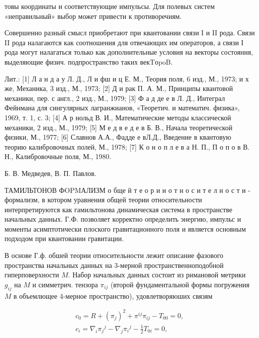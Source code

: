 \documentclass[10pt]{article}
\begin{document}
товы координаты и соответствующие импульсы. Для полевых систем «неправильный» выбор может привести к противоречиям.



Совершенно разный смысл приобретают при квантовании связи I и II рода. Связи II рода налагаются как соотношения для отвечающих им операторов, а связи І рода могут налагаться только как дополнительные условия на векторы состояния, выделяющие физич. подпространство таких векTоpoB.



Лит.: [1] Л а н д а у Л. Д., Л и фш и ц Е. М., Теория поля, 6 изд., М., 1973; и х же, Механика, 3 изд., М., 1973; [2] Д и рак П. А. М., Принципы квантовой механики, пер. с англ., 2 изд., М., 1979; [3] Ф а д де е в Л. Д., Интеграл Фейнмана для сингулярных лагранжианов, «Теоретич. и математич. физика», 1969, т. 1, с. 3; [4] А р нольд В. И., Математические методы классической механики, 2 изд., М., 1979; [5] М е д в е д е в Б. В., Начала теоретической физики, М., 1977; [6] Славнов А.А., Фадде е вЛ.Д., Введение в квантовую теорию калибровочных полей, М., 1978; [7] К о н о п л е в а Н. П., П о п о в В. Н., Калибровочные поля, М., 1980.



Б. В. Медведев, В. П. Павлов.



ТАМИЛЬТОНОВ ФOPMАЛИЗМ о бще й т е о р и и о т н о с и т е л н о с т и - формализм, в котором уравнения общей теории относительности интерпретируются как гамильтонова динамическая система в пространстве начальных данных. Г.Ф. позволяет корректно определить энергию, импульс и моменты асимптотически плоского гравитационного поля и является основным подходом при квантовании гравитации.



В основе Г.ф. обшей теории относительности лежит описание фазового пространства начальных данных на 3-мерной пространственноподобной гиперповерхности $M$. Набор начальных данных состоит из римановой метрики $g_{i j}$ на $M$ и симметрич. тензора $\pi_{i j}$ (второй фундаментальной формы погружения $M$ в объемлющее 4-мерное пространство), удовлетворяюших связям



\[

\begin{gathered}

c_{0}=R+\left(\pi_{j}\right)^{2}+\pi^{i j} \pi_{i j}-T_{00}=0, \\

c_{i}=\nabla_{i} \pi_{j}{ }^{j}-\nabla_{j} \pi_{i}{ }^{j}-\frac{1}{2} T_{0 i}=0,

\end{gathered}

\]
\end{document}
